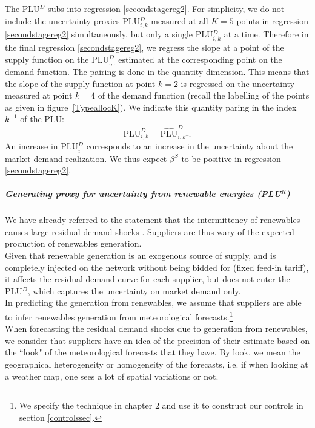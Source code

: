 The PLU$^{D}$ subs into regression \ref{secondstagereg2}. 
For simplicity, we do not include the uncertainty proxies PLU$^D_{i,k}$ measured at all $K=5$ points in regression \ref{secondstagereg2} simultaneously, but only a single PLU$^D_{i,k}$ at a time. 
Therefore in the final regression \ref{secondstagereg2}, we regress the slope at a point of the supply function on the PLU$^D_{.,.}$ estimated at the corresponding point on the demand function. The pairing is done in the quantity dimension. This means that the slope of the supply function at point $k=2$ is regressed on the uncertainty measured at point $k=4$ of the demand function (recall the labelling of the points as given in figure~\ref{TypeallocK}). We indicate this quantity paring in the index $k^{-1}$ of the PLU:
\begin{equation}
\label{levelproxy}
\text{PLU}^D_{i,k} = 
\widehat{\text{PLU}}^D_{i,k^{-1}} 
\end{equation}
An increase in PLU$^D_i$ corresponds to an increase in the uncertainty about the market demand realization. We thus expect $\beta^S$ to be positive in regression \ref{secondstagereg2}.


\subparagraph{Generating proxy for uncertainty from renewable energies (PLU$^R$)}
\label{proxyautocorrel}

We have already referred to the statement that the intermittency of renewables causes large residual demand shocks \cite{epexwebsite1}. Suppliers are thus wary of the expected production of renewables generation. \\

Given that renewable generation is an exogenous source of supply, and is completely injected on the network without being bidded for (fixed feed-in tariff), it affects the residual demand curve for each supplier, but does not enter the PLU$^D$, which captures the uncertainty on market demand only. \\

In predicting the generation from renewables, we assume that suppliers are able to infer renewables generation from meteorological forecasts.\footnote{We specify the technique in chapter 2 and use it to construct our controls in section \ref{controlssec}.}\\

When forecasting the residual demand shocks due to generation from renewables, we consider that suppliers have an idea of the precision of their estimate based on the ``look" of the meteorological forecasts that they have. By look, we mean the geographical heterogeneity or homogeneity of the forecasts, i.e. if when looking at a weather map, one sees a lot of spatial variations or not. \\

